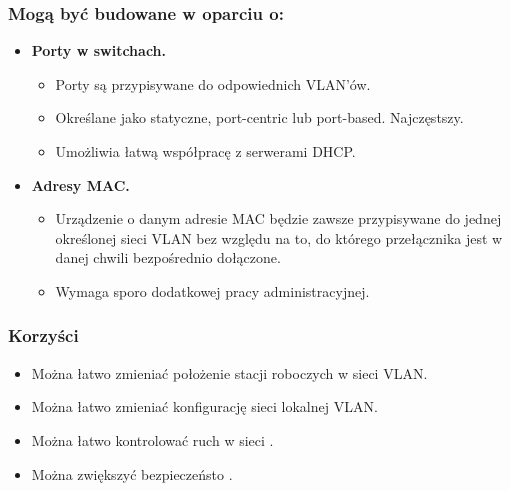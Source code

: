\documentclass[../sk-egzamin.tex]{subfiles}
\begin{document}
\subsubsection*{Mogą być budowane w oparciu o:}
\begin{itemize}
    \item \textbf{Porty w switchach.}
    \begin{itemize}
        \item Porty są przypisywane do odpowiednich VLAN'ów.
        \item Określane jako statyczne, port-centric lub port-based.
        Najczęstszy.
        \item Umożliwia łatwą współpracę z serwerami DHCP.
    \end{itemize}
    \item \textbf{Adresy MAC.}
    \begin{itemize}
        \item Urządzenie o danym adresie MAC będzie zawsze przypisywane do
        jednej określonej sieci VLAN bez względu na to, do którego przełącznika
        jest w danej chwili bezpośrednio dołączone.

        \item Wymaga sporo dodatkowej pracy administracyjnej.
    \end{itemize}
\end{itemize}

\subsubsection*{Korzyści}
\begin{itemize}
    \item Można łatwo zmieniać położenie stacji roboczych w sieci VLAN.
    \item Można łatwo zmieniać konfigurację sieci lokalnej VLAN.
    \item Można łatwo kontrolować ruch w sieci .
    \item Można zwiększyć bezpieczeństo .
\end{itemize}
\end{document}
